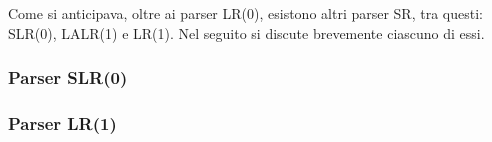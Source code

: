\documentclass{subfiles}
\begin{document}
Come si anticipava, oltre ai parser LR(0), esistono altri parser SR, tra questi: SLR(0), LALR(1) e LR(1).
Nel seguito si discute brevemente ciascuno di essi.

\subsubsection{Parser SLR(0)}


\subsubsection{Parser LR(1)}

\end{document}
